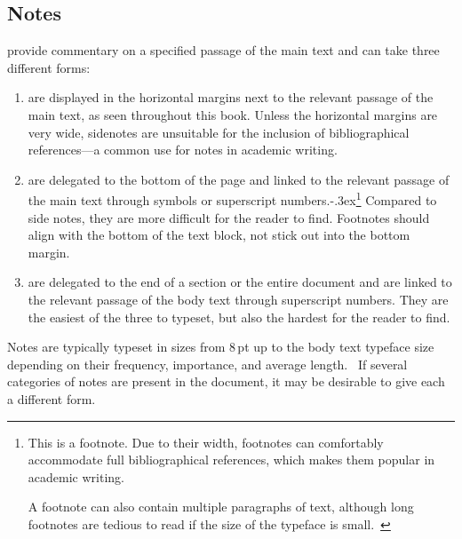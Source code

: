 \subsection{Notes}
 provide commentary on a specified passage of the main text and can
take three different forms:
\begin{enumerate}
  \item[1] are displayed in the horizontal margins next to the
    relevant passage of the main text, as seen throughout this book.  Unless the
    horizontal margins are very wide, sidenotes are unsuitable for the inclusion
    of bibliographical references---a common use for notes in academic writing.
  \item[2] are delegated to the bottom of the page and linked
    to the relevant passage of the main text through symbols or superscript
    numbers.\kern-.3ex\footnote{%
      This is a footnote. Due to their width, footnotes can
      comfortably accommodate full bibliographical references, which makes them
      popular in academic writing.
      
      A footnote can also contain multiple paragraphs of text, although long
      footnotes are tedious to read if the size of the typeface is
      small.~\cite[sec.\,4.3.1]{bringhurst92}}
    Compared to side notes, they are more difficult for the reader to find.
    Footnotes should align with the bottom of the text block, not stick out into
    the bottom margin.~\cite[para.\,48]{kapr99}
  \item[3] are delegated to the end of a section or the entire
    document and are linked to the relevant passage of the body text through
    superscript numbers. They are the easiest of the three to typeset, but also
    the hardest for the reader to find.
\end{enumerate}

Notes are typically typeset in sizes from 8\,pt up to the body text typeface
size depending on their frequency, importance, and average
length.~\cite[sec.\,4.3]{bringhurst92} If several categories of notes are
present in the document, it may be desirable to give each a different form.

